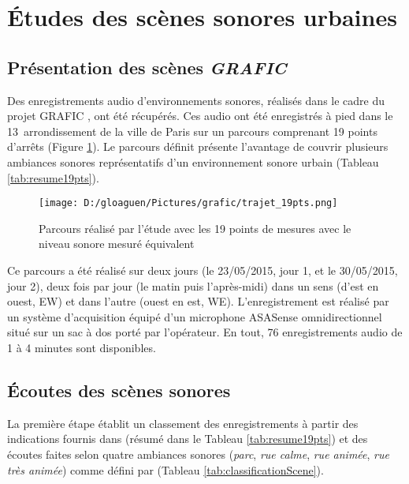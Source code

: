 \section{Études des scènes sonores urbaines}
\subsection{Présentation des scènes \textit{GRAFIC}}

Des enregistrements audio d'environnements sonores, réalisés dans le cadre du projet GRAFIC \cite{aumond_modelling_2017}, ont été récupérés. Ces audio ont été enregistrés à pied dans le 13\ieme~arrondissement de la ville de Paris sur un parcours comprenant 19 points d'arrêts (Figure \ref{fig:parcoursGRAFIC}). Le parcours définit présente l'avantage de couvrir plusieurs ambiances sonores représentatifs d'un environnement sonore urbain (Tableau \ref{tab:resume19pts}).\\
 
\begin{figure}[hbtp]
\centering
\texttt{[image: D:/gloaguen/Pictures/grafic/trajet\_19pts.png]}
\caption{Parcours réalisé par l'étude avec les 19 points de mesures avec le niveau sonore mesuré équivalent}
\label{fig:parcoursGRAFIC}
\end{figure}

Ce parcours a été réalisé sur deux jours (le 23/05/2015, jour 1, et le 30/05/2015, jour 2), deux fois par jour (le matin puis l'après-midi) dans un sens (d'est en ouest, EW) et dans l'autre (ouest en est, WE). L'enregistrement est réalisé par un système d'acquisition équipé d'un microphone ASASense omnidirectionnel situé sur un sac à dos porté par l'opérateur. En tout, 76 enregistrements audio de 1 à 4 minutes sont disponibles. \\




\subsection{Écoutes des scènes sonores}

La première étape établit un classement des enregistrements à partir des indications fournis dans \cite{aumond_modelling_2017} (résumé dans le Tableau \ref{tab:resume19pts}) et des écoutes faites selon quatre ambiances sonores (\textit{parc}, \textit{rue calme}, \textit{rue animée}, \textit{rue très animée}) comme défini par \cite{can_describing_2015} (Tableau \ref{tab:classificationScene}).\\

